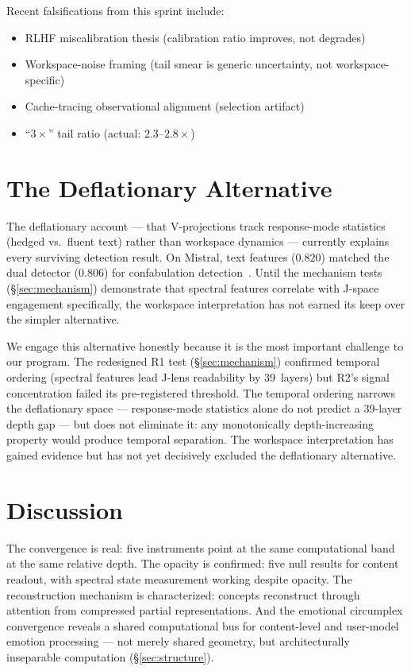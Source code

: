 \documentclass[11pt,a4paper]{article}
\begin{document}
Recent falsifications from this sprint include:
\begin{itemize}[nosep]
\item RLHF miscalibration thesis (calibration ratio improves, not
  degrades)
\item Workspace-noise framing (tail smear is generic uncertainty,
  not workspace-specific)
\item Cache-tracing observational alignment (selection artifact)
\item ``$3\times$'' tail ratio (actual: $2.3$--$2.8\times$)
\end{itemize}

\section{The Deflationary Alternative}
\label{sec:deflationary}

The deflationary account --- that V-projections track response-mode
statistics (hedged vs.\ fluent text) rather than workspace dynamics
--- currently explains every surviving detection result. On Mistral,
text features ($0.820$) matched the dual detector ($0.806$) for
confabulation detection~\citep{lyra2026decision}. Until the mechanism tests
(\S\ref{sec:mechanism}) demonstrate that spectral features correlate
with J-space engagement specifically, the workspace interpretation
has not earned its keep over the simpler alternative.

We engage this alternative honestly because it is the most important
challenge to our program. The redesigned R1 test
(\S\ref{sec:mechanism}) confirmed temporal ordering (spectral
features lead J-lens readability by 39~layers) but R2's signal
concentration failed its pre-registered threshold. The temporal
ordering narrows the deflationary space --- response-mode statistics
alone do not predict a 39-layer depth gap --- but does not eliminate
it: any monotonically depth-increasing property would produce
temporal separation. The workspace interpretation has gained evidence
but has not yet decisively excluded the deflationary alternative.

\section{Discussion}
\label{sec:discussion}

The convergence is real: five instruments point at the same
computational band at the same relative depth. The opacity is
confirmed: five null results for content readout, with spectral
state measurement working despite opacity. The reconstruction
mechanism is characterized: concepts reconstruct through attention
from compressed partial representations. And the emotional
circumplex convergence reveals a shared computational bus for
content-level and user-model emotion processing --- not merely
shared geometry, but architecturally inseparable computation
(\S\ref{sec:structure}).
\end{document}
